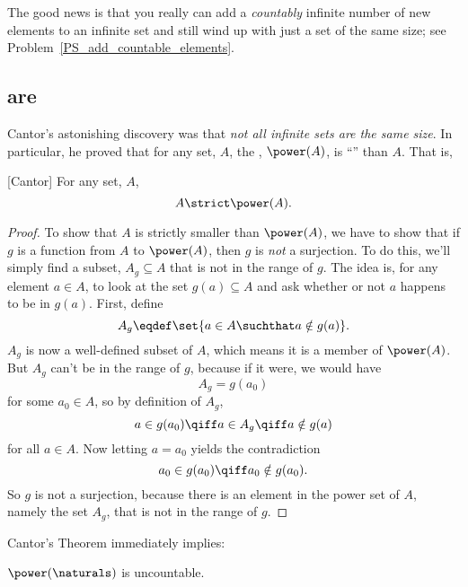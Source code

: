 The good news is that you really can add a \emph{countably} infinite
number of new elements to an infinite set and still wind up with just
a set of the same size; see Problem~\ref{PS_add_countable_elements}.

\subsection{ are }

Cantor's astonishing discovery was that \emph{not all infinite sets
  are the same size}.  In particular, he proved that for any set, $A$,
the , $\power(A)$, is ``'' than
$A$.  That is,
\begin{theorem}\label{powbig}[Cantor]\mbox{}
For any set, $A$,
\[
A \strict \power(A).
\]
\end{theorem}
\begin{proof}
\iffalse
  First of all, $\power(A)$ is as big as $A$: for example, the partial
  function $f:\power(A) \to A$, where $f(\set{a}) \eqdef a$ for $a \in
  A$ and $f$ is only defined on one-element sets, is a surjection.
\fi
 
To show that $A$ is strictly smaller than $\power(A)$, we have to show
that if $g$ is a function from $A$ to $\power(A)$, then $g$ is \emph{not} a
surjection.  To do this, we'll simply find a subset, $A_g \subseteq A$
that is not in the range of $g$.  The idea is, for any element $a \in
A$, to look at the set $g(a) \subseteq A$ and ask whether or not $a$
happens to be in $g(a)$.  First, define \iffalse mimicking Russell's
Paradox,\fi
  \[
  A_g \eqdef \set{a \in A \suchthat a \notin g(a)}.
  \]
  $A_g$ is now a well-defined subset of $A$, which means it is a
  member of $\power(A)$.  But $A_g$ can't be in the range of $g$,
  because if it were, we would have
\[
A_g = g(a_0)
\]
for some $a_0 \in A$, so by definition of $A_g$,
\[
a \in g(a_0) \qiff a \in A_g \qiff a \notin g(a)
\]
for all $a \in A$.  Now letting $a = a_0$ yields the contradiction
\[
a_0 \in g(a_0) \qiff a_0 \notin g(a_0).
\]
So $g$ is not a surjection, because there is an element in the power
set of $A$, namely the set $A_g$, that is not in the range of $g$.
\end{proof}

Cantor's Theorem immediately implies:

\begin{corollary}
$\power(\naturals)$ is uncountable.
\end{corollary}

